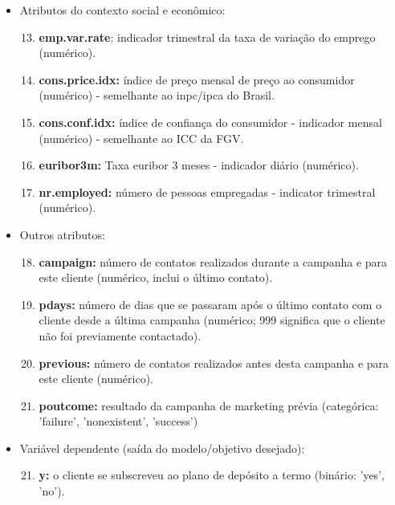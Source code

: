 \documentclass[twoside,conference,a4paper]{IEEEtran}
\begin{document}
\begin{itemize}
	\item Atributos do contexto social e econômico:

	\begin{enumerate}
		\setcounter{enumi}{12}
		\item {\bf emp.var.rate}: indicador trimestral da taxa de variação do emprego (numérico).

		\item {\bf cons.price.idx:} índice de preço mensal de preço ao consumidor (numérico) - semelhante ao inpc/ipca do Brasil.

		\item {\bf cons.conf.idx:} índice de confiança do consumidor - indicador mensal (numérico) - semelhante ao ICC da FGV.

		\item {\bf euribor3m:} Taxa euribor 3 meses - indicador diário (numérico).

		\item {\bf nr.employed:} número de pessoas empregadas - indicator trimestral (numérico).
	\end{enumerate}

	\item Outros atributos:

	\begin{enumerate}
		\setcounter{enumi}{17}
		\item {\bf campaign:} número de contatos realizados durante a campanha e para este cliente (numérico, inclui o último contato).

		\item {\bf pdays:} número de dias que se passaram após o último contato com o cliente desde a última campanha (numérico; 999 significa que o cliente não foi previamente contactado).

		\item {\bf previous:} número de contatos realizados antes desta campanha e para este cliente (numérico).

		\item {\bf poutcome:} resultado da campanha de marketing prévia (categórica: 'failure', 'nonexistent', 'success')
	\end{enumerate} 

	\item Variável dependente (saída do modelo/objetivo desejado):

	\begin{enumerate}
		\setcounter{enumi}{20}
		\item {\bf y:} o cliente se subscreveu ao plano de depósito a termo (binário: 'yes', 'no').
	\end{enumerate}
\end{itemize}
\end{document}
